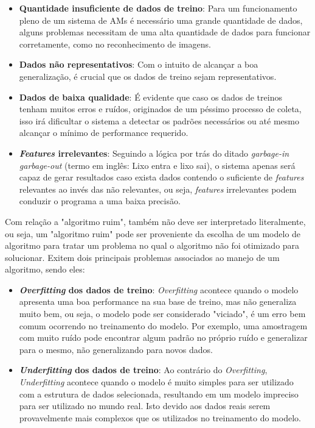 \begin{itemize}
    \item \textbf{Quantidade insuficiente de dados de treino}: Para um funcionamento pleno de um sistema de AMs é necessário uma grande quantidade de dados, alguns problemas necessitam de uma alta quantidade de dados para funcionar corretamente, como no reconhecimento de imagens.
    \item \textbf{Dados não representativos}: Com o intuito de alcançar a boa generalização, é crucial que os dados de treino sejam representativos.
    \item \textbf{Dados de baixa qualidade}: É evidente que caso os dados de treinos tenham muitos erros e ruídos, originados de um péssimo processo de coleta, isso irá dificultar o sistema a detectar os padrões necessários ou até mesmo alcançar o mínimo de performance requerido.
    \item \textbf{\textit{Features}  irrelevantes}: Seguindo a lógica por trás do ditado \textit{garbage-in garbage-out} (termo em inglês: Lixo entra e lixo sai), o sistema apenas será capaz de gerar resultados caso exista dados contendo o suficiente de \textit{features} relevantes ao invés das não relevantes, ou seja, \textit{features} irrelevantes podem conduzir o programa a uma baixa precisão.
\end{itemize}

Com relação a "algoritmo ruim", também não deve ser interpretado literalmente, ou seja, um "algoritmo ruim" pode ser proveniente da escolha de um modelo de algoritmo para tratar um problema no qual o algoritmo não foi otimizado para solucionar. Exitem dois principais problemas associados ao manejo de um algoritmo, sendo eles:

\begin{itemize}
    \item \textbf{\textit{Overfitting} dos dados de treino}: \textit{Overfitting} acontece quando o modelo apresenta uma boa performance na sua base de treino, mas não generaliza muito bem, ou seja, o modelo pode ser considerado "viciado", é um erro bem comum ocorrendo no treinamento do modelo. Por exemplo, uma amostragem com muito ruído pode encontrar algum padrão no próprio ruído e generalizar para o mesmo, não generalizando para novos dados.
    \item \textbf{\textit{Underfitting} dos dados de treino}: Ao contrário do \textit{Overfitting}, \textit{Underfitting} acontece quando o modelo é muito simples para ser utilizado com a estrutura de dados selecionada, resultando em um modelo impreciso para ser utilizado no mundo real. Isto devido aos dados reais serem provavelmente mais complexos que os utilizados no treinamento do modelo.
\end{itemize}

